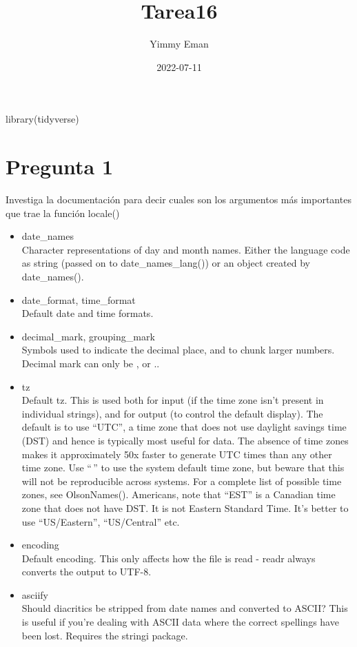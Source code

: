 \documentclass[
]{article}
\title{Tarea16}
\author{Yimmy Eman}
\date{2022-07-11}
\newenvironment{Shaded}{\begin{snugshade}}{\end{snugshade}}
\newcommand{\FunctionTok}[1]{\textcolor[rgb]{0.00,0.00,0.00}{#1}}
\newcommand{\NormalTok}[1]{#1}
\begin{document}
\maketitle

\begin{Shaded}
\begin{Highlighting}[]
\FunctionTok{library}\NormalTok{(tidyverse)}
\end{Highlighting}
\end{Shaded}

\hypertarget{pregunta-1}{%
\section{Pregunta 1}\label{pregunta-1}}

Investiga la documentación para decir cuales son los argumentos más
importantes que trae la función locale()

\begin{itemize}
\item
  date\_names\\
  Character representations of day and month names. Either the language
  code as string (passed on to date\_names\_lang()) or an object created
  by date\_names().
\item
  date\_format, time\_format\\
  Default date and time formats.
\item
  decimal\_mark, grouping\_mark\\
  Symbols used to indicate the decimal place, and to chunk larger
  numbers. Decimal mark can only be ⁠,⁠ or ..
\item
  tz\\
  Default tz. This is used both for input (if the time zone isn't
  present in individual strings), and for output (to control the default
  display). The default is to use ``UTC'', a time zone that does not use
  daylight savings time (DST) and hence is typically most useful for
  data. The absence of time zones makes it approximately 50x faster to
  generate UTC times than any other time zone. Use ``\,'' to use the
  system default time zone, but beware that this will not be
  reproducible across systems. For a complete list of possible time
  zones, see OlsonNames(). Americans, note that ``EST'' is a Canadian
  time zone that does not have DST. It is not Eastern Standard Time.
  It's better to use ``US/Eastern'', ``US/Central'' etc.
\item
  encoding\\
  Default encoding. This only affects how the file is read - readr
  always converts the output to UTF-8.
\item
  asciify\\
  Should diacritics be stripped from date names and converted to ASCII?
  This is useful if you're dealing with ASCII data where the correct
  spellings have been lost. Requires the stringi package.
\end{itemize}
\end{document}
